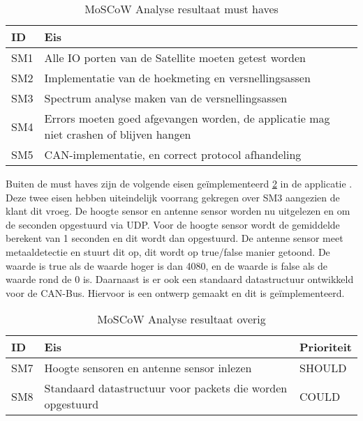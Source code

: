 \begin{table}[h!]
	\centering
	\caption{MoSCoW Analyse resultaat must haves}
	\label{tab:must}
	\begin{tabular}{lp{15cm}}
	\toprule
	\textbf{ID} & \textbf{Eis} \\ \midrule
	SM1			& Alle IO porten van de Satellite moeten getest worden 										\\
	SM2			& Implementatie van de hoekmeting en versnellingsassen 										\\ 
	SM3			& Spectrum analyse maken van de versnellingsassen 											\\ 
	SM4			& Errors moeten goed afgevangen worden, de applicatie mag niet crashen of blijven hangen 	\\ 
	SM5			& CAN-implementatie, en correct protocol afhandeling										\\ \bottomrule
	\end{tabular}
\end{table}

\noindent Buiten de must haves zijn de volgende eisen geïmplementeerd \ref{tab:shouldetc} in de applicatie . Deze twee eisen hebben uiteindelijk voorrang gekregen over SM3 aangezien de klant dit vroeg. De hoogte sensor en antenne sensor worden nu uitgelezen en om de seconden opgestuurd via UDP. Voor de hoogte sensor wordt de gemiddelde berekent van 1 seconden en dit wordt dan opgestuurd. De antenne sensor meet metaaldetectie en stuurt dit op, dit wordt op true/false manier getoond. De waarde is true als de waarde hoger is dan 4080, en de waarde is false als de waarde rond de 0 is. Daarnaast is er ook een standaard datastructuur ontwikkeld voor de CAN-Bus. Hiervoor is een ontwerp gemaakt en dit is geïmplementeerd. 

\begin{table}[h!]

\centering
	\caption{MoSCoW Analyse resultaat overig}
	\label{tab:shouldetc}
	\begin{tabular}{lp{13cm}l}
	\toprule
	\textbf{ID} & \textbf{Eis} & \textbf{Prioriteit}\\ \midrule
	SM7			& Hoogte sensoren en antenne sensor inlezen 				 & SHOULD \\  \midrule
	SM8			& Standaard datastructuur voor packets die worden opgestuurd & COULD	 \\\bottomrule
	\end{tabular}
\end{table}


